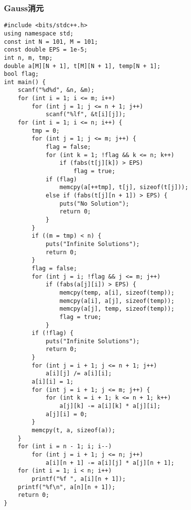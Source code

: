 \documentclass[a4paper]{article}
\begin{document}
\subsubsection{Gauss消元}
\begin{lstlisting}
#include <bits/stdc++.h>
using namespace std;
const int N = 101, M = 101;
const double EPS = 1e-5;
int n, m, tmp;
double a[M][N + 1], t[M][N + 1], temp[N + 1];
bool flag;
int main() {
    scanf("%d%d", &n, &m);
    for (int i = 1; i <= m; i++)
        for (int j = 1; j <= n + 1; j++)
            scanf("%lf", &t[i][j]);
    for (int i = 1; i <= n; i++) {
        tmp = 0;
        for (int j = 1; j <= m; j++) {
            flag = false;
            for (int k = 1; !flag && k <= n; k++)
                if (fabs(t[j][k]) > EPS)
                    flag = true;
            if (flag)
                memcpy(a[++tmp], t[j], sizeof(t[j]));
            else if (fabs(t[j][n + 1]) > EPS) {
                puts("No Solution");
                return 0;
            }
        }
        if ((m = tmp) < n) {
            puts("Infinite Solutions");
            return 0;
        }
        flag = false;
        for (int j = i; !flag && j <= m; j++)
            if (fabs(a[j][i]) > EPS) {
                memcpy(temp, a[i], sizeof(temp));
                memcpy(a[i], a[j], sizeof(temp));
                memcpy(a[j], temp, sizeof(temp));
                flag = true;
            }
        if (!flag) {
            puts("Infinite Solutions");
            return 0;
        }
        for (int j = i + 1; j <= n + 1; j++)
            a[i][j] /= a[i][i];
        a[i][i] = 1;
        for (int j = i + 1; j <= m; j++) {
            for (int k = i + 1; k <= n + 1; k++)
                a[j][k] -= a[i][k] * a[j][i];
            a[j][i] = 0;
        }
        memcpy(t, a, sizeof(a));
    }
    for (int i = n - 1; i; i--)
        for (int j = i + 1; j <= n; j++)
            a[i][n + 1] -= a[i][j] * a[j][n + 1];
    for (int i = 1; i < n; i++)
        printf("%f ", a[i][n + 1]);
    printf("%f\n", a[n][n + 1]);
    return 0;
}
\end{lstlisting}
\end{document}
